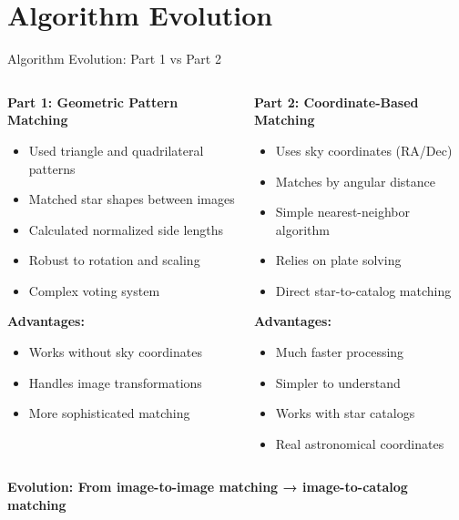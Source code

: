 \documentclass[aspectratio=169]{beamer}
\begin{document}
\section{Algorithm Evolution}

\begin{frame}{Algorithm Evolution: Part 1 vs Part 2}
\begin{columns}
\begin{column}{0.5\textwidth}
\textbf{Part 1: Geometric Pattern Matching}
\begin{itemize}
\item Used \textcolor{starred}{triangle} and \textcolor{starred}{quadrilateral} patterns
\item Matched star \textcolor{starred}{shapes} between images
\item Calculated normalized side lengths
\item Robust to rotation and scaling
\item Complex voting system
\end{itemize}

\textbf{Advantages:}
\begin{itemize}
\item Works without sky coordinates
\item Handles image transformations
\item More sophisticated matching
\end{itemize}
\end{column}

\begin{column}{0.5\textwidth}
\textbf{Part 2: Coordinate-Based Matching}
\begin{itemize}
\item Uses \textcolor{stargreen}{sky coordinates} (RA/Dec)
\item Matches by \textcolor{stargreen}{angular distance}
\item Simple nearest-neighbor algorithm
\item Relies on plate solving
\item Direct star-to-catalog matching
\end{itemize}

\textbf{Advantages:}
\begin{itemize}
\item Much faster processing
\item Simpler to understand
\item Works with star catalogs
\item Real astronomical coordinates
\end{itemize}
\end{column}
\end{columns}

\vspace{0.5cm}
\begin{center}
\textcolor{starblue}{\textbf{Evolution: From image-to-image matching → image-to-catalog matching}}
\end{center}
\end{frame}
\end{document}
